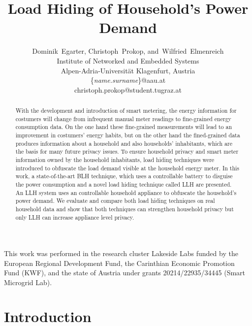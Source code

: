 \documentclass{article}
\makeatletter
\def\blfootnote{
 \xdef\@thefnmark{}\@footnotetext
 }
\makeatother
\begin{document}
	\setlength{\baselineskip}{.965\baselineskip}



\title{Load Hiding of Household's Power Demand}

 \author{
Dominik~Egarter{\small }, Christoph~Prokop{\small }, and~Wilfried~Elmenreich{\small }\\
Institute of Networked and Embedded Systems\\
 Alpen-Adria-Universit\"at Klagenfurt, Austria\\
 {\small }\{\emph{name.surname}\}@aau.at\\
 {\small }christoph.prokop@student.tugraz.at
 }

\maketitle              \blfootnote{ 
This work was performed in the research cluster Lakeside Labs funded by the European Regional Development Fund, the Carinthian Economic Promotion Fund (KWF), and the state of Austria under grants 20214/22935/34445 (Smart Microgrid Lab).
}
\begin{abstract}
With the development and introduction of smart metering, the energy information for costumers will change from infrequent manual meter readings to fine-grained energy consumption data. 
On the one hand these fine-grained measurements will lead to an improvement in costumers' energy habits, but on the other hand the fined-grained data produces information about a household and also households' inhabitants, which are the basis for many future privacy issues.
To ensure household privacy and smart meter information owned by the household inhabitants,  load hiding techniques were introduced to obfuscate the load demand visible at the household energy meter.
In this work, a state-of-the-art \ac{BLH} technique, which uses a controllable battery to disguise the power consumption and a novel load hiding technique called \ac{LLH} are presented. 
An \ac{LLH} system uses an controllable household appliance to obfuscate the household's power demand.
We evaluate and compare both load hiding techniques on real household data and show that both techniques can strengthen household privacy but only \ac{LLH} can increase appliance level privacy.
\end{abstract}
\section{Introduction}
\end{document}
